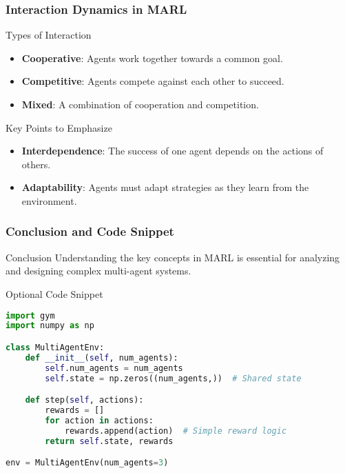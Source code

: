 \documentclass[aspectratio=169]{beamer}
\begin{document}
\begin{frame}[fragile]
    \frametitle{Interaction Dynamics in MARL}
    \begin{block}{Types of Interaction}
        \begin{itemize}
            \item \textbf{Cooperative}: Agents work together towards a common goal.
            \item \textbf{Competitive}: Agents compete against each other to succeed.
            \item \textbf{Mixed}: A combination of cooperation and competition.
        \end{itemize}
    \end{block}
    
    \begin{block}{Key Points to Emphasize}
        \begin{itemize}
            \item \textbf{Interdependence}: The success of one agent depends on the actions of others.
            \item \textbf{Adaptability}: Agents must adapt strategies as they learn from the environment.
        \end{itemize}
    \end{block}
\end{frame}

\begin{frame}[fragile]
    \frametitle{Conclusion and Code Snippet}
    \begin{block}{Conclusion}
        Understanding the key concepts in MARL is essential for analyzing and designing complex multi-agent systems.
    \end{block}
    
    \begin{block}{Optional Code Snippet}
        \begin{lstlisting}[language=Python]
import gym
import numpy as np

class MultiAgentEnv:
    def __init__(self, num_agents):
        self.num_agents = num_agents
        self.state = np.zeros((num_agents,))  # Shared state

    def step(self, actions):
        rewards = []
        for action in actions:
            rewards.append(action)  # Simple reward logic
        return self.state, rewards

env = MultiAgentEnv(num_agents=3)
        \end{lstlisting}
    \end{block}
\end{frame}
\end{document}
